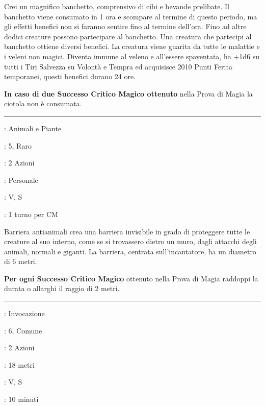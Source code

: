 \begin{multicols}{2}
Crei un magnifico banchetto, comprensivo di cibi e bevande prelibate. Il banchetto viene consumato in 1 ora e scompare al termine di questo periodo, ma gli effetti benefici non si faranno sentire fino al termine dell'ora. Fino ad altre dodici creature possono
partecipare al banchetto. Una creatura che partecipi al banchetto ottiene diversi benefici. La creatura viene guarita da tutte le malattie e i veleni non magici. Diventa immune al veleno e all'essere spaventata, ha +1d6 su tutti i Tiri Salvezza su Volontà e Tempra ed acquisisce 2010 Punti Ferita temporanei, questi benefici durano 24 ore.

\textbf{In caso di due Successo Critico Magico ottenuto} nella Prova di Magia la ciotola non è consumata.

\smallskip\noindent\rule{\linewidth}{2pt} \hypertarget{Barriera Antianimali}{}\smallskip{}
\noindent
\begin{description}[noitemsep, topsep=0pt, parsep=0pt, partopsep=0pt, leftmargin=0cm, labelwidth=2.8cm]
	\item[\textbf{Lista di Magia}]: Animali e Piante
	\item[\textbf{Livello}]: 5, Raro
	\item[\textbf{T. di Lancio}]: 2 Azioni
	\item[\textbf{Gittata}]: Personale
	\item[\textbf{Componenti}]: V, S
	\item[\textbf{Durata}]: 1 turno per CM
\end{description}

Barriera antianimali crea una barriera invisibile in grado di proteggere tutte le creature al suo interno, come se si trovassero dietro un muro, dagli attacchi degli animali, normali e giganti. La barriera, centrata sull'incantatore, ha un diametro di 6 metri.

\textbf{Per ogni Successo Critico Magico} ottenuto nella Prova di Magia raddoppi la durata o allarghi il raggio di 2 metri.

\smallskip\noindent\rule{\linewidth}{2pt} \hypertarget{Barriera di Lame}{}\smallskip{}
\noindent
\begin{description}[noitemsep, topsep=0pt, parsep=0pt, partopsep=0pt, leftmargin=0cm, labelwidth=2.8cm]
	\item[\textbf{Lista di Magia}]: Invocazione
	\item[\textbf{Livello}]: 6, Comune
	\item[\textbf{T. di Lancio}]: 2 Azioni
	\item[\textbf{Gittata}]: 18 metri
	\item[\textbf{Componenti}]: V, S
	\item[\textbf{Durata}]: 10 minuti
\end{description}


\end{multicols}
